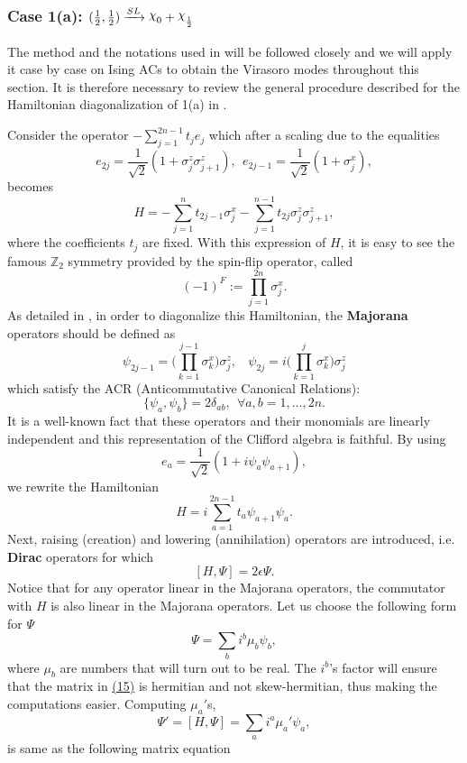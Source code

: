 \documentclass[twoside,11pt,titlepage]{amsart}
\renewcommand{\=}[1]{\stackrel{#1}{=}} %
\theoremstyle{definition}
\theoremstyle{remark}
\DeclareRobustCommand{\rchi}{{\mathpalette\irchi\relax}}
\newcommand{\irchi}[2]{\raisebox{\depth}{$#1\chi$}}
\begin{document}
\subsubsection*{\textbf{Case 1(a): $(\frac{1}{2},\frac{1}{2}) \xrightarrow{SL} \rchi_0+\rchi_{\frac{1}{2}}$}}
\hfill \break
The method and the notations used in \cite{fendley2014free} will be followed closely and we will apply it case by case on Ising ACs to obtain the Virasoro modes throughout this section. It is therefore necessary to review the general procedure described for the Hamiltonian diagonalization of 1(a) in \cite{fendley2014free}. 

Consider the operator $-\sum_{j=1}^{2n-1} t_je_j$ which after a scaling due to the equalities
$$e_{2j}=\frac{1}{\sqrt{2}}(1+\sigma_{j}^z\sigma_{j+1}^z), \ \ e_{2j-1}=\frac{1}{\sqrt{2}}(1+\sigma_j^x),$$
becomes
$$H= -\sum_{j=1}^{n} t_{2j-1} \sigma_j^{x}-\sum_{j=1}^{n-1} t_{2j} \sigma_{j}^z \sigma_{j+1}^z,$$
where the coefficients $t_j$ are fixed. With this expression of $H$, it is easy to see the famous $\mathbb{Z}_2$ symmetry provided by the spin-flip operator, called
$$(-1)^F:= \prod_{j=1}^{2n} \sigma_j^x.$$
As detailed in \cite{fendley2014free}, in order to diagonalize this Hamiltonian, the \textbf{Majorana} operators should be defined as
$$ \psi_{2j-1}=\Big( \prod_{k=1}^{j-1} \sigma_k^x  \Big) \sigma_j^z, \ \ \ \ \psi_{2j}= i\Big(\prod_{k=1}^{j} \sigma_k^x  \Big) \sigma_j^z $$
which satisfy the ACR (Anticommutative Canonical Relations):
$$\{\psi_a,\psi_b\}=2\delta_{ab} , \ \  \forall a,b=1, \ldots,2n.$$
It is a well-known fact that these operators and their monomials are linearly independent and this representation of the Clifford algebra is faithful. By using
$$e_a=\frac{1}{\sqrt{2}}(1+i\psi_{a}\psi_{a+1}),$$
we rewrite the Hamiltonian 
$$H=i \sum_{a=1}^{2n-1} t_a \psi_{a+1}\psi_a.$$
Next, raising (creation) and lowering (annihilation) operators are introduced, i.e. \textbf{Dirac} operators for which
$$[H,\Psi]=2\epsilon \Psi.$$
Notice that for any operator linear in the Majorana operators, the commutator with $H$ is also linear in the Majorana operators. Let us choose the following form for $\Psi$
$$\Psi = \sum_b i^b \mu_b \psi_b,$$
where $\mu_b$ are numbers that will turn out to be real. The $i^b$'s factor will ensure that the matrix in \hyperref[eq15]{(15)} is hermitian and not skew-hermitian, thus making the computations easier. Computing $\mu_a'$s, 
$$\Psi'=[H,\Psi]= \sum_{a} i^a\mu_a' \psi_a,$$
is same as the following matrix equation
\end{document}
